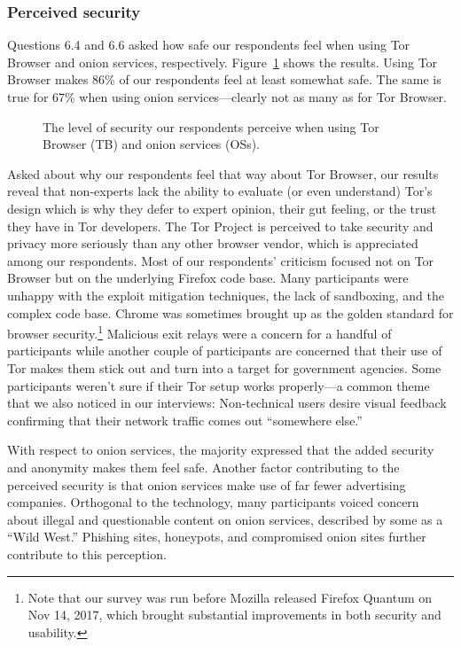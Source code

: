 \subsubsection{Perceived security}

Questions 6.4 and 6.6 asked how safe our respondents feel when using Tor Browser
and onion services, respectively.  Figure~\ref{fig:perceived-security} shows the
results.  Using Tor Browser makes 86\% of our respondents feel at least somewhat
safe.  The same is true for 67\% when using onion services---clearly not as many
as for Tor Browser.

\begin{figure}[t]
    \centering
    
    \caption{The level of security our respondents perceive when using Tor
    Browser (TB) and onion services (OSs).}
    \label{fig:perceived-security}
\end{figure}

Asked about why our respondents feel that way about Tor Browser, our results
reveal that non-experts lack the ability to evaluate (or even understand) Tor's
design which is why they defer to expert opinion, their gut feeling, or the
trust they have in Tor developers.  The Tor Project is perceived to take
security and privacy more seriously than any other browser vendor, which is
appreciated among our respondents.  Most of our respondents' criticism focused
not on Tor Browser but on the underlying Firefox code base.  Many participants
were unhappy with the exploit mitigation techniques, the lack of sandboxing, and
the complex code base.  Chrome was sometimes brought up as the golden standard
for browser security.\footnote{Note that our survey was run before Mozilla
released Firefox Quantum on Nov 14, 2017, which brought substantial improvements
in both security and usability.}  Malicious exit relays were a concern for a
handful of participants while another couple of participants are concerned that
their use of Tor makes them stick out and turn into a target for government
agencies.  Some participants weren't sure if their Tor setup works properly---a
common theme that we also noticed in our interviews: Non-technical users desire
visual feedback confirming that their network traffic comes out ``somewhere
else.''

With respect to onion services, the majority expressed that the added security
and anonymity makes them feel safe.  Another factor contributing to the
perceived security is that onion services make use of far fewer advertising
companies.  Orthogonal to the technology, many participants voiced concern about
illegal and questionable content on onion services, described by some as a
``Wild West.''  Phishing sites, honeypots, and compromised onion sites further
contribute to this perception.
